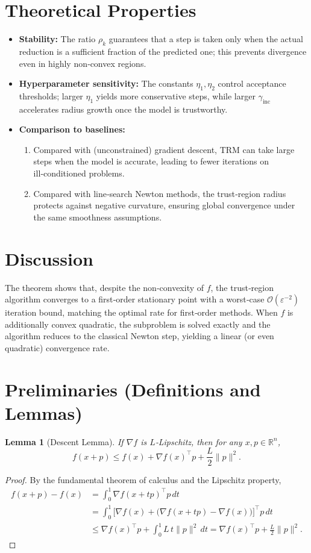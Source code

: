 \documentclass{article}
\newtheorem{lemma}{Lemma}
\newcommand{\RR}{\mathbb{R}}
\begin{document}
\section*{Theoretical Properties}
\begin{itemize}
\item \textbf{Stability:} The ratio $\rho_k$ guarantees that a step is taken only when the actual reduction is a sufficient fraction of the predicted one; this prevents divergence even in highly non‑convex regions.
\item \textbf{Hyperparameter sensitivity:} The constants $\eta_1,\eta_2$ control acceptance thresholds; larger $\eta_1$ yields more conservative steps, while larger $\gamma_{\text{inc}}$ accelerates radius growth once the model is trustworthy.
\item \textbf{Comparison to baselines:}
\begin{enumerate}[label=(\alph*)]
\item Compared with (unconstrained) gradient descent, TRM can take large steps when the model is accurate, leading to fewer iterations on ill‑conditioned problems.
\item Compared with line‑search Newton methods, the trust‑region radius protects against negative curvature, ensuring global convergence under the same smoothness assumptions.
\end{enumerate}
\end{itemize}

\section*{Discussion}
The theorem shows that, despite the non‑convexity of $f$, the trust‑region algorithm converges to a first‑order stationary point with a worst‑case $\mathcal{O}(\varepsilon^{-2})$ iteration bound, matching the optimal rate for first‑order methods. When $f$ is additionally convex quadratic, the subproblem is solved exactly and the algorithm reduces to the classical Newton step, yielding a linear (or even quadratic) convergence rate.

\newpage
\section*{Preliminaries (Definitions and Lemmas)}
\begin{lemma}[Descent Lemma]\label{lem:descent}
If $\nabla f$ is $L$‑Lipschitz, then for any $x,p\in\RR^{n}$,
\[
f(x+p)\le f(x)+\nabla f(x)^{\top}p+\frac{L}{2}\|p\|^{2}.
\]
\end{lemma}
\begin{proof}
By the fundamental theorem of calculus and the Lipschitz property,
\[
\begin{aligned}
f(x+p)-f(x)&=\int_{0}^{1}\nabla f(x+tp)^{\top}p\,dt\\
&=\int_{0}^{1}\bigl[\nabla f(x)+\bigl(\nabla f(x+tp)-\nabla f(x)\bigr)\bigr]^{\top}p\,dt\\
&\le \nabla f(x)^{\top}p+\int_{0}^{1}L\,t\|p\|^{2}\,dt
 = \nabla f(x)^{\top}p+\frac{L}{2}\|p\|^{2}.
\end{aligned}
\]
\end{proof}
\end{document}
